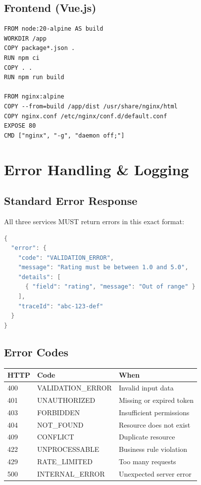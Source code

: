 \documentclass[12pt,letterpaper]{article}
\begin{document}
\subsection{Frontend (Vue.js)}
\begin{lstlisting}[style=code]
FROM node:20-alpine AS build
WORKDIR /app
COPY package*.json .
RUN npm ci
COPY . .
RUN npm run build

FROM nginx:alpine
COPY --from=build /app/dist /usr/share/nginx/html
COPY nginx.conf /etc/nginx/conf.d/default.conf
EXPOSE 80
CMD ["nginx", "-g", "daemon off;"]
\end{lstlisting}

\newpage

\section{Error Handling \& Logging}

\subsection{Standard Error Response}
All three services MUST return errors in this exact format:
\begin{lstlisting}[style=code,language=Java]
{
  "error": {
    "code": "VALIDATION_ERROR",
    "message": "Rating must be between 1.0 and 5.0",
    "details": [
      { "field": "rating", "message": "Out of range" }
    ],
    "traceId": "abc-123-def"
  }
}
\end{lstlisting}

\subsection{Error Codes}
\begin{tabular}{|l|l|l|}
\hline
\textbf{HTTP} & \textbf{Code} & \textbf{When} \\
\hline
400 & VALIDATION\_ERROR & Invalid input data \\
401 & UNAUTHORIZED & Missing or expired token \\
403 & FORBIDDEN & Insufficient permissions \\
404 & NOT\_FOUND & Resource does not exist \\
409 & CONFLICT & Duplicate resource \\
422 & UNPROCESSABLE & Business rule violation \\
429 & RATE\_LIMITED & Too many requests \\
500 & INTERNAL\_ERROR & Unexpected server error \\
\hline
\end{tabular}
\end{document}
